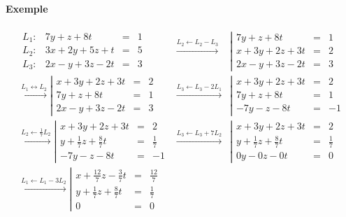 \paragraph{Exemple}
\begin{eqnarray*}
  \begin{array}{lrcl}
    L_1: & 7 y + z + 8 t & = & 1 \\
    L_2: & 3 x + 2 y + 5 z + t & = & 5 \\
    L_3: & 2 x - y + 3 z - 2 t & = & 3
  \end{array}
  &\xrightarrow{L_2 \leftarrow L_2 - L_3}&
  \left\vert \begin{array}{rcl}
    7 y + z + 8 t & = & 1 \\
    x + 3 y + 2 z + 3 t & = & 2 \\
    2 x - y + 3 z - 2 t & = & 3
  \end{array} \right. \\
%  
  \xrightarrow{L_1 \leftrightarrow L_2}
  \left\vert \begin{array}{rcl}
    x + 3 y + 2 z + 3 t & = & 2 \\
    7 y + z + 8 t & = & 1 \\
    2 x - y + 3 z - 2 t & = & 3
  \end{array} \right.
  &\xrightarrow{L_3 \leftarrow L_3 - 2 L_1}&
  \left\vert \begin{array}{rcl}
    x + 3 y + 2 z + 3 t & = & 2 \\
    7 y + z + 8 t & = & 1 \\
    -7 y - z - 8 t & = & -1
  \end{array} \right. \\
%  
  \xrightarrow{L_2 \leftarrow \frac{1}{7} L_2}
  \left\vert \begin{array}{rcl}
    x + 3 y + 2 z + 3 t & = & 2 \\
    y + \frac{1}{7} z + \frac{8}{7} t & = & \frac{1}{7} \\
    -7 y - z - 8 t & = & -1
  \end{array} \right. 
  &\xrightarrow{L_3 \leftarrow L_3 + 7 L_2}&
  \left\vert \begin{array}{rcl}
    x + 3 y + 2 z + 3 t & = & 2 \\
    y + \frac{1}{7} z + \frac{8}{7} t & = & \frac{1}{7} \\
    0 y - 0 z - 0 t & = & 0
  \end{array} \right. \\
%  
  \xrightarrow{L_1 \leftarrow L_1 - 3 L_2}
  \left\vert \begin{array}{rcl}
    x + \frac{12}{7} z - \frac{3}{7} t & = & \frac{12}{7} \\
    y + \frac{1}{7} z + \frac{8}{7} t & = & \frac{1}{7} \\
    0 & = & 0
  \end{array} \right.
\end{eqnarray*} \\
